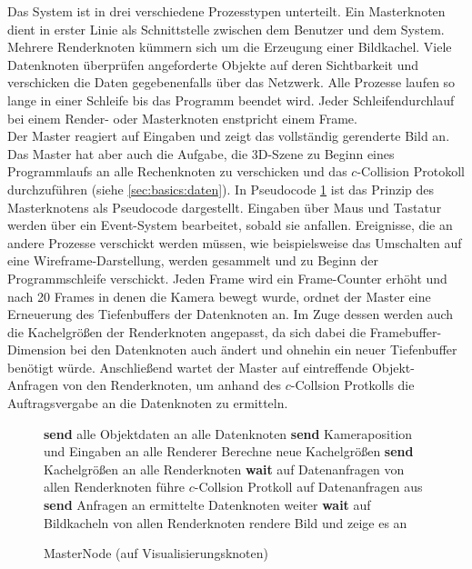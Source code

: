 Das System ist in drei verschiedene Prozesstypen unterteilt. Ein Masterknoten dient in erster Linie als Schnittstelle zwischen dem Benutzer und dem System. Mehrere Renderknoten kümmern sich um die Erzeugung einer Bildkachel. Viele Datenknoten überprüfen angeforderte Objekte auf deren Sichtbarkeit und verschicken die Daten gegebenenfalls über das Netzwerk. Alle Prozesse laufen so lange in einer Schleife bis das Programm beendet wird. Jeder Schleifendurchlauf bei einem Render- oder Masterknoten enstpricht einem Frame.\\
Der Master reagiert auf Eingaben und zeigt das vollständig gerenderte Bild an. Das Master hat aber auch die Aufgabe, die 3D-Szene zu Beginn eines Programmlaufs an alle Rechenknoten zu verschicken und das $c$-Collision Protokoll durchzuführen (siehe \ref{sec:basics:daten}). In Pseudocode \ref{alg:impl:masternode} ist das Prinzip des Masterknotens als Pseudocode dargestellt. Eingaben über Maus und Tastatur werden über ein Event-System bearbeitet, sobald sie anfallen. Ereignisse, die an andere Prozesse verschickt werden müssen, wie beispielsweise das Umschalten auf eine Wireframe-Darstellung, werden gesammelt und zu Beginn der Programmschleife verschickt. Jeden Frame wird ein Frame-Counter erhöht und nach 20 Frames in denen die Kamera bewegt wurde, ordnet der Master eine Erneuerung des Tiefenbuffers der Datenknoten an. Im Zuge dessen werden auch die Kachelgrößen der Renderknoten angepasst, da sich dabei die Framebuffer-Dimension bei den Datenknoten auch ändert und ohnehin ein neuer Tiefenbuffer benötigt würde. Anschließend wartet der Master auf eintreffende Objekt-Anfragen von den Renderknoten, um anhand des $c$-Collsion Protkolls die Auftragsvergabe an die Datenknoten zu ermitteln.
\begin{figure}[ttt!]
\centering
 \begin{minipage}[t]{12cm}
\begin{algorithm}[H]
  \caption{MasterNode (auf Visualisierungsknoten)\label{alg:impl:masternode}} 
    \begin{algorithmic} [1]
      \STATE \textbf{send} alle Objektdaten an alle Datenknoten
      \LOOP
	\STATE \textbf{send} Kameraposition und Eingaben an alle Renderer
	  \STATE Berechne neue Kachelgrößen
	  \STATE \textbf{send} Kachelgrößen an alle Renderknoten
	\ENDIF
	\STATE \textbf{wait} auf Datenanfragen von allen Renderknoten
	\STATE führe $c$-Collsion Protkoll auf Datenanfragen aus
	\STATE \textbf{send} Anfragen an ermittelte Datenknoten weiter
	\STATE \textbf{wait} auf Bildkacheln von allen Renderknoten
	\STATE rendere Bild und zeige es an
      \ENDLOOP
    \end{algorithmic}
\end{algorithm}
 \end{minipage}
\end{figure}

